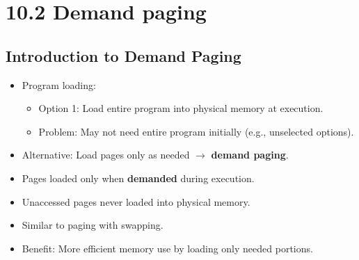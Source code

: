 \section{10.2 Demand paging}

\subsection{Introduction to Demand Paging}
\begin{itemize}
    \item Program loading:
    \begin{itemize}
        \item Option 1: Load entire program into physical memory at execution.
        \item Problem: May not need entire program initially (e.g., unselected options).
    \end{itemize}
    \item Alternative: Load pages only as needed $\rightarrow$ \textbf{demand paging}.
    \item Pages loaded only when \textbf{demanded} during execution.
    \item Unaccessed pages never loaded into physical memory.
    \item Similar to paging with swapping.
    \item Benefit: More efficient memory use by loading only needed portions.
\end{itemize}

